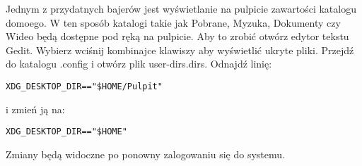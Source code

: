 Jednym z przydatnych bajerów jest wyświetlanie na pulpicie zawartości katalogu domoego. W ten sposób katalogi takie jak Pobrane, Myzuka, Dokumenty czy Wideo będą dostępne pod ręką na pulpicie. Aby to zrobić otwórz edytor tekstu Gedit. Wybierz  wciśnij kombinajce klawiszy  aby wyświetlić ukryte pliki. Przejdź do katalogu .config i otwórz plik \textcolor{ubuntu_orange}{user-dirs.dirs}. Odnajdź linię:
\begin{lstlisting}
XDG_DESKTOP_DIR=="$HOME/Pulpit"
\end{lstlisting}
i zmień ją na:
\begin{lstlisting}
XDG_DESKTOP_DIR=="$HOME"
\end{lstlisting}

Zmiany będą widoczne po ponowny zalogowaniu się do systemu.